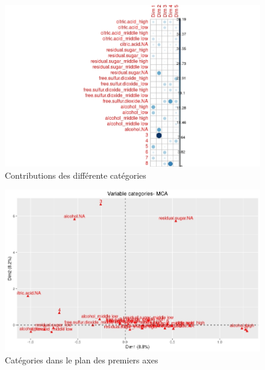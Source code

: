 \documentclass[11pt,a4paper]{article}
\begin{document}
\begin{figure}[ht]

\includegraphics[width=\textwidth,keepaspectratio]{contrib}

\caption{Contributions des différente catégories}
\label{fig:contrib}
\end{figure}



\begin{figure}[ht]

\includegraphics[width=\textwidth,keepaspectratio]{"biplot-mca"}

\caption{Catégories dans le plan des premiers axes}
\label{fig:biplot}
\end{figure}
\end{document}
